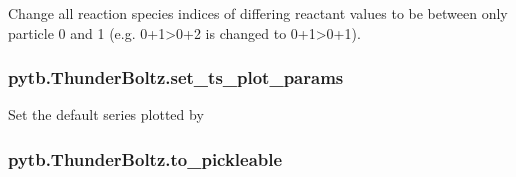 \documentclass[letterpaper,10pt,english,openany,oneside]{sphinxmanual}
\begin{document}
\begin{fulllineitems}
\begin{fulllineitems}
\label{\detokenize{api/pytb.ThunderBoltz.set_fixed_tracking:pytb.ThunderBoltz.set_fixed_tracking}}
\pysigstartsignatures
{}
\pysigstopsignatures
\sphinxAtStartPar
Change all reaction species indices of differing reactant values
to be between only particle 0 and 1 (e.g. 0+1\sphinxhyphen{}\textgreater{}0+2 is changed to 0+1\sphinxhyphen{}\textgreater{}0+1).

\end{fulllineitems}


\sphinxstepscope


\subsubsection{pytb.ThunderBoltz.set\_ts\_plot\_params}
\label{\detokenize{api/pytb.ThunderBoltz.set_ts_plot_params:pytb-thunderboltz-set-ts-plot-params}}\label{\detokenize{api/pytb.ThunderBoltz.set_ts_plot_params::doc}}

\begin{fulllineitems}
\label{\detokenize{api/pytb.ThunderBoltz.set_ts_plot_params:pytb.ThunderBoltz.set_ts_plot_params}}
\pysigstartsignatures
{}
\pysigstopsignatures
\sphinxAtStartPar
Set the default series plotted by
{\hyperref[\detokenize{api/pytb.ThunderBoltz.plot_timeseries:pytb.ThunderBoltz.plot_timeseries}]{}}

\end{fulllineitems}


\sphinxstepscope


\subsubsection{pytb.ThunderBoltz.to\_pickleable}
\label{\detokenize{api/pytb.ThunderBoltz.to_pickleable:pytb-thunderboltz-to-pickleable}}\label{\detokenize{api/pytb.ThunderBoltz.to_pickleable::doc}}


\end{fulllineitems}
\end{document}
